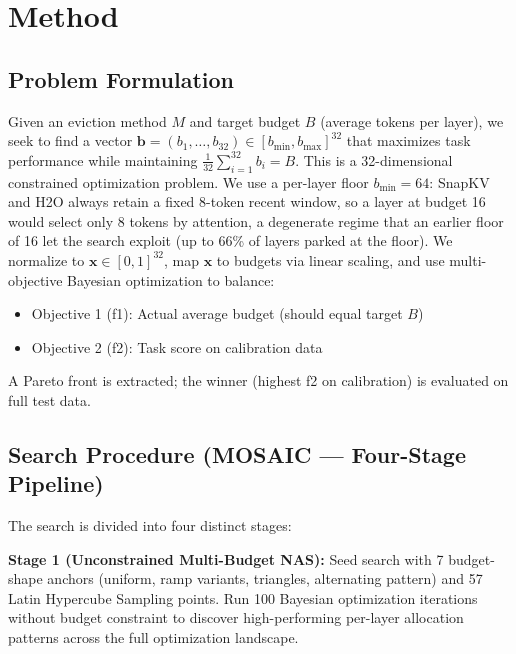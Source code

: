 \documentclass[11pt]{article}
\begin{document}
\section{Method}

\subsection{Problem Formulation}

Given an eviction method $M$ and target budget $B$ (average tokens per layer), we seek to find a vector $\mathbf{b} = (b_1, \ldots, b_{32}) \in [b_{\min}, b_{\max}]^{32}$ that maximizes task performance while maintaining $\frac{1}{32}\sum_{i=1}^{32} b_i = B$. This is a 32-dimensional constrained optimization problem. We use a per-layer floor $b_{\min} = 64$: SnapKV and H2O always retain a fixed 8-token recent window, so a layer at budget 16 would select only 8 tokens by attention, a degenerate regime that an earlier floor of 16 let the search exploit (up to 66\% of layers parked at the floor). We normalize to $\mathbf{x} \in [0,1]^{32}$, map $\mathbf{x}$ to budgets via linear scaling, and use multi-objective Bayesian optimization to balance:
\begin{itemize}
\item Objective 1 (f1): Actual average budget (should equal target $B$)
\item Objective 2 (f2): Task score on calibration data
\end{itemize}

A Pareto front is extracted; the winner (highest f2 on calibration) is evaluated on full test data.

\subsection{Search Procedure (MOSAIC — Four-Stage Pipeline)}

The search is divided into four distinct stages:

\textbf{Stage 1 (Unconstrained Multi-Budget NAS):} Seed search with 7 budget-shape anchors (uniform, ramp variants, triangles, alternating pattern) and 57 Latin Hypercube Sampling points. Run 100 Bayesian optimization iterations without budget constraint to discover high-performing per-layer allocation patterns across the full optimization landscape.
\end{document}
